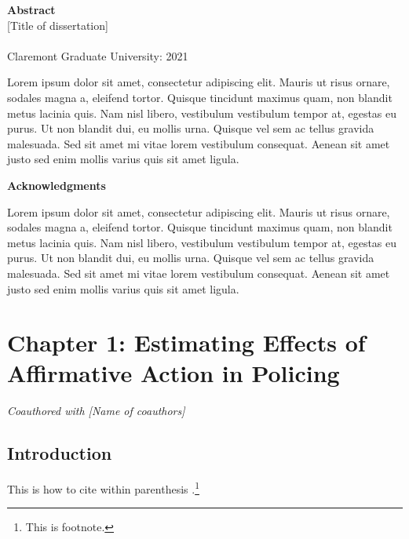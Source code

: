 \documentclass[12pt, letterpage]{article}
\begin{document}
\clearpage
\onehalfspacing


\clearpage
\begin{center}
{\Large\bfseries Abstract} \\[2.5ex]
[Title of dissertation] \\
[Name of author] \\
Claremont Graduate University: 2021 \\
\end{center}
Lorem ipsum dolor sit amet, consectetur adipiscing elit. Mauris ut risus ornare, sodales magna a, eleifend tortor. Quisque tincidunt maximus quam, non blandit metus lacinia quis. Nam nisl libero, vestibulum vestibulum tempor at, egestas eu purus. Ut non blandit dui, eu mollis urna. Quisque vel sem ac tellus gravida malesuada. Sed sit amet mi vitae lorem vestibulum consequat. Aenean sit amet justo sed enim mollis varius quis sit amet ligula.

\clearpage
\onehalfspacing

\setcounter{page}{5}

\clearpage
\begin{center}
{\Large\bfseries Acknowledgments} \\[2.5ex]
\end{center}
Lorem ipsum dolor sit amet, consectetur adipiscing elit. Mauris ut risus ornare, sodales magna a, eleifend tortor. Quisque tincidunt maximus quam, non blandit metus lacinia quis. Nam nisl libero, vestibulum vestibulum tempor at, egestas eu purus. Ut non blandit dui, eu mollis urna. Quisque vel sem ac tellus gravida malesuada. Sed sit amet mi vitae lorem vestibulum consequat. Aenean sit amet justo sed enim mollis varius quis sit amet ligula.

\clearpage
\onehalfspacing

\tableofcontents
\newpage



\section{Chapter 1: Estimating Effects of Affirmative Action in Policing}

\textit{Coauthored with [Name of coauthors]}

\subsection{Introduction}
This is how to cite within parenthesis \citep{doj}.\footnote{This is footnote.}
\end{document}
